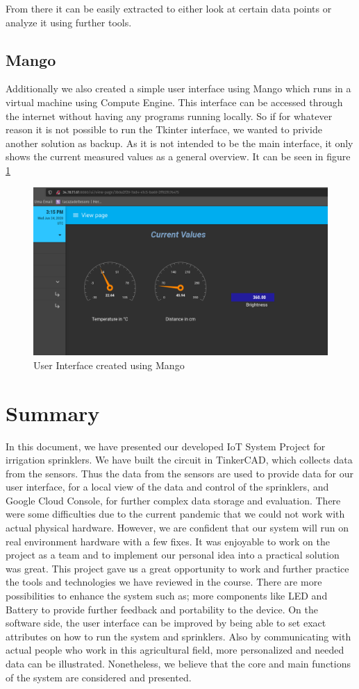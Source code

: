 \documentclass{article}
\begin{document}
From there it can be easily extracted to either look at certain data points or analyze it using further tools.
\subsection{Mango}
Additionally we also created a simple user interface using Mango which runs in a virtual machine using Compute Engine. This interface can be accessed through the internet without having any programs running locally. So if for whatever reason it is not possible to run the Tkinter interface, we wanted to privide another solution as backup. As it is not intended to be the main interface, it only shows the current measured values as a general overview. It can be seen in figure \ref{fig:mango}
\begin{figure}
    \centering
    \includegraphics[scale=0.35]{mango.png}
    \caption{User Interface created using Mango}
    \label{fig:mango}
\end{figure}
\section{Summary}
In this document, we have presented our developed IoT System Project for irrigation sprinklers. We have built the circuit in TinkerCAD, which collects data from the sensors. Thus the data from the sensors are used to provide data for our user interface, for a local view of the data and control of the sprinklers, and Google Cloud Console, for further complex data storage and evaluation. There were some difficulties due to the current pandemic that we could not work with actual physical hardware. However, we are confident that our system will run on real environment hardware with a few fixes. \newline
It was enjoyable to work on the project as a team and to implement our personal idea into a practical solution was great. This project gave us a great opportunity to work and further practice the tools and technologies we have reviewed in the course. There are more possibilities to enhance the system such as; more components like LED and Battery to provide further feedback and portability to the device. On the software side, the user interface can be improved by being able to set exact attributes on how to run the system and sprinklers. Also by communicating with actual people who work in this agricultural field, more personalized and needed data can be illustrated. Nonetheless, we believe that the core and main functions of the system are considered and presented.
\end{document}
